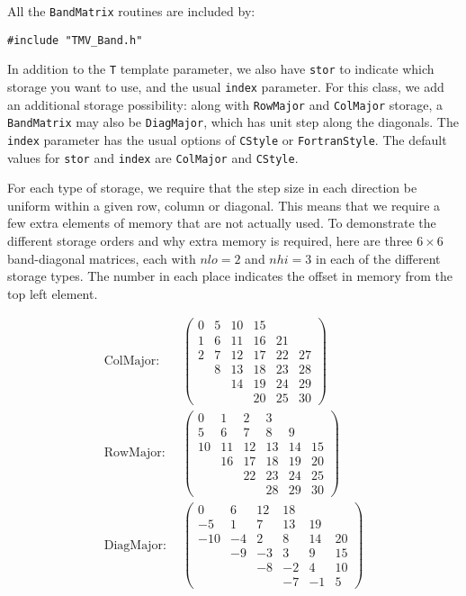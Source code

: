 \documentclass[twoside,letterpaper,11pt]{article}
\renewcommand{\tt}[1]{{\texttt {#1}}}
\begin{document}
All the \tt{BandMatrix} routines are included by:
\begin{verbatim}
#include "TMV_Band.h"
\end{verbatim}

In addition to the \tt{T} template parameter, we also have \tt{stor} to indicate 
which storage you want to use, and the usual \tt{index} parameter.
For this class, we add an additional storage possibility:
along with \tt{RowMajor} and 
\tt{ColMajor} storage, a \tt{BandMatrix} may also be \tt{DiagMajor}, which 
has unit step along the diagonals.  The \tt{index} parameter has the usual
options of \tt{CStyle} or \tt{FortranStyle}.
The default values for \tt{stor} and \tt{index} are \tt{ColMajor} and \tt{CStyle}.

For each type of storage, we require that the step size in each direction
be uniform within a given row, column or diagonal. 
This means that we require a few extra elements
of memory that are not actually used.
To demonstrate the different storage orders and why extra memory is required, 
here are three $6 \times 6$ band-diagonal
matrices, each with $nlo = 2$ and $nhi = 3$ in each of the different storage
types.  The number in each place indicates the offset in memory from the 
top left element.

\begin{align*}
\textrm{ColMajor:} ~ ~ & \left(\begin{array}{cccccc}0 & 5 & 10 & 15 &  &  \\1 & 6 & 11 & 16 & 21 &  \\2 & 7 & 12 & 17 & 22 & 27 \\ & 8 & 13 & 18 & 23 & 28 \\ &  & 14 & 19 & 24 & 29 \\ &  &  & 20 & 25 & 30\end{array}\right) \\
\textrm{RowMajor:} ~  ~ & \left(\begin{array}{cccccc}0 & 1 & 2 & 3 &  &  \\ 5 & 6 & 7 & 8 & 9 &  \\ 10 & 11 & 12 & 13 & 14 & 15 \\ & 16 & 17 & 18 & 19 & 20 \\ &  & 22 & 23 & 24 & 25 \\ &  &  & 28 & 29 & 30\end{array}\right) \\
\textrm{DiagMajor:} ~  ~ & \left(\begin{array}{cccccc}0 & 6 & 12 & 18 &  &  \\-5 & 1 & 7 & 13 & 19 &  \\ -10 & -4 & 2 & 8 & 14 & 20 \\ & -9 & -3 & 3 & 9 & 15 \\ &  & -8 & -2 & 4 & 10 \\ &  &  & -7 & -1 & 5\end{array}\right)
\end{align*}
\end{document}
